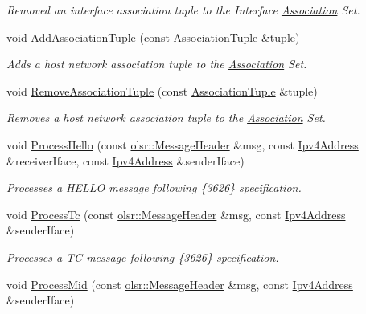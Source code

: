 \begin{DoxyCompactItemize}
\begin{DoxyCompactList}\small\item\em Removed an interface association tuple to the Interface \hyperlink{structns3_1_1olsr_1_1Association}{Association} Set. \end{DoxyCompactList}\item 
void \hyperlink{classns3_1_1olsr_1_1RoutingProtocol_ad6e926e46d787847b63433a0b9072553}{Add\+Association\+Tuple} (const \hyperlink{structns3_1_1olsr_1_1AssociationTuple}{Association\+Tuple} \&tuple)
\begin{DoxyCompactList}\small\item\em Adds a host network association tuple to the \hyperlink{structns3_1_1olsr_1_1Association}{Association} Set. \end{DoxyCompactList}\item 
void \hyperlink{classns3_1_1olsr_1_1RoutingProtocol_adde5e8973ecbb7a4cbe0c8585e5c2237}{Remove\+Association\+Tuple} (const \hyperlink{structns3_1_1olsr_1_1AssociationTuple}{Association\+Tuple} \&tuple)
\begin{DoxyCompactList}\small\item\em Removes a host network association tuple to the \hyperlink{structns3_1_1olsr_1_1Association}{Association} Set. \end{DoxyCompactList}\item 
void \hyperlink{classns3_1_1olsr_1_1RoutingProtocol_a9518c29e8994234ead40d408498237ce}{Process\+Hello} (const \hyperlink{classns3_1_1olsr_1_1MessageHeader}{olsr\+::\+Message\+Header} \&msg, const \hyperlink{classns3_1_1Ipv4Address}{Ipv4\+Address} \&receiver\+Iface, const \hyperlink{classns3_1_1Ipv4Address}{Ipv4\+Address} \&sender\+Iface)
\begin{DoxyCompactList}\small\item\em Processes a H\+E\+L\+LO message following \{3626\} specification. \end{DoxyCompactList}\item 
void \hyperlink{classns3_1_1olsr_1_1RoutingProtocol_a5087b5cbf87313f1073341aebc9ced27}{Process\+Tc} (const \hyperlink{classns3_1_1olsr_1_1MessageHeader}{olsr\+::\+Message\+Header} \&msg, const \hyperlink{classns3_1_1Ipv4Address}{Ipv4\+Address} \&sender\+Iface)
\begin{DoxyCompactList}\small\item\em Processes a TC message following \{3626\} specification. \end{DoxyCompactList}\item 
void \hyperlink{classns3_1_1olsr_1_1RoutingProtocol_a88dd2a9e226e50034c548787d9d529f3}{Process\+Mid} (const \hyperlink{classns3_1_1olsr_1_1MessageHeader}{olsr\+::\+Message\+Header} \&msg, const \hyperlink{classns3_1_1Ipv4Address}{Ipv4\+Address} \&sender\+Iface)

\end{DoxyCompactItemize}
